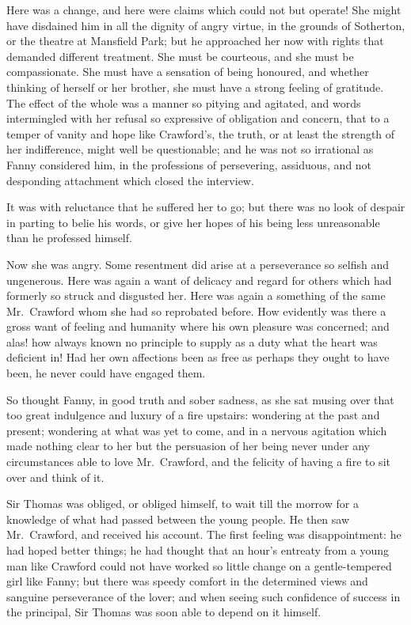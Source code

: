 Here was a change, and here were claims which could
not but operate!  She might have disdained him in all
the dignity of angry virtue, in the grounds of Sotherton,
or the theatre at Mansfield Park; but he approached
her now with rights that demanded different treatment.
She must be courteous, and she must be compassionate.
She must have a sensation of being honoured, and whether
thinking of herself or her brother, she must have a strong
feeling of gratitude.  The effect of the whole was a
manner so pitying and agitated, and words intermingled
with her refusal so expressive of obligation and concern,
that to a temper of vanity and hope like Crawford's,
the truth, or at least the strength of her indifference,
might well be questionable; and he was not so irrational
as Fanny considered him, in the professions of persevering,
assiduous, and not desponding attachment which closed
the interview.

It was with reluctance that he suffered her to go; but there
was no look of despair in parting to belie his words,
or give her hopes of his being less unreasonable than he
professed himself.

Now she was angry.  Some resentment did arise at a
perseverance so selfish and ungenerous.  Here was again
a want of delicacy and regard for others which had formerly
so struck and disgusted her.  Here was again a something
of the same Mr.\ Crawford whom she had so reprobated before.
How evidently was there a gross want of feeling and humanity
where his own pleasure was concerned; and alas! how always
known no principle to supply as a duty what the heart
was deficient in!  Had her own affections been as free
as perhaps they ought to have been, he never could have engaged
them.

So thought Fanny, in good truth and sober sadness,
as she sat musing over that too great indulgence and luxury
of a fire upstairs:  wondering at the past and present;
wondering at what was yet to come, and in a nervous
agitation which made nothing clear to her but the persuasion
of her being never under any circumstances able to love
Mr.\ Crawford, and the felicity of having a fire to sit
over and think of it.

Sir Thomas was obliged, or obliged himself, to wait till
the morrow for a knowledge of what had passed between
the young people.  He then saw Mr.\ Crawford, and received
his account.  The first feeling was disappointment:
he had hoped better things; he had thought that an hour's
entreaty from a young man like Crawford could not have worked
so little change on a gentle-tempered girl like Fanny;
but there was speedy comfort in the determined views
and sanguine perseverance of the lover; and when seeing
such confidence of success in the principal, Sir Thomas
was soon able to depend on it himself.

